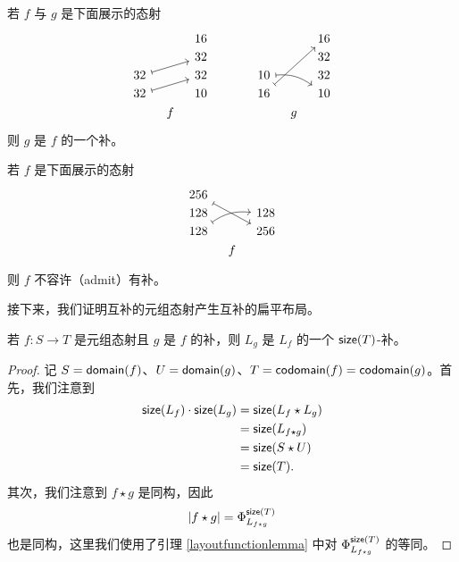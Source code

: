 \begin{example}
    若 $f$ 与 $g$ 是下面展示的态射
    \[ \begin{tikzcd} [row sep = 1, column sep = 8]
     & & 16 & & & & & & 16 \\
     & & 32 & & & &  & & 32\\
    32 \ar[rru,mapsto] & & 32 & & & & 10 \ar[rrd, bend left = 20, mapsto] & & 32\\
    32 \ar[rru,mapsto] & & 10 & & & & 16 \ar[rruuu, mapsto]  & & 10 \\
     & f & & & & & & g &
    \end{tikzcd} \]
    则 $g$ 是 $f$ 的一个补。
\end{example}

\begin{example}
    若 $f$ 是下面展示的态射
    \[\begin{tikzcd}[row sep = 1, column sep = 8]
    256 \ar[rrdd,mapsto] & & \\
    128 & & 128\\
    128 \ar[rru,bend left = 20,mapsto] & & 256 \\
    & f & \\
    \end{tikzcd} \]
    则 $f$ 不容许（admit）有补。
\end{example}

\noindent 接下来，我们证明互补的元组态射产生互补的扁平布局。

\begin{proposition}\label{complementofmorphisminCproposition}
    若 $f:S \to T$ 是元组态射且 $g$ 是 $f$ 的补，则 $L_{g}$ 是 $L_f$ 的一个 $\mathsf{size}(T)$-补。
\end{proposition}

\begin{proof}
    记 $S = \mathsf{domain}(f)$、$U = \mathsf{domain}(g)$、$T = \mathsf{codomain}(f) = \mathsf{codomain}(g)$。首先，我们注意到
    \begin{align*}
    \mathsf{size}(L_f) \cdot \mathsf{size}(L_{g}) & = \mathsf{size}(L_f\star L_{g})\\
    & = \mathsf{size}(L_{f \star g})\\
    & = \mathsf{size}(S \star U)\\
    & = \mathsf{size}(T).
    \end{align*}
    其次，我们注意到 $f \star g$ 是同构，因此
    \[
    |f \star g| = \Phi_{L_{f \star g}}^{\mathsf{size}(T)}
    \]
    也是同构，这里我们使用了引理 \ref{layoutfunctionlemma} 中对 $\Phi^{\mathsf{size}(T)}_{L_{f \star g}}$ 的等同。
\end{proof}

